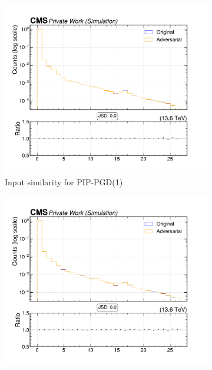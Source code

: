 \begin{figure}[htbp]
  \centering
  \begin{subfigure}[t]{0.32\textwidth}
    \includegraphics[width=\linewidth]{media/output/features/compare/combined_it_1/cmp_vtx_arr_sv_d3d.pdf}
    \caption*{Input similarity for PIP-PGD(1)}
  \end{subfigure}\hfill
  \begin{subfigure}[t]{0.32\textwidth}
    \includegraphics[width=\linewidth]{media/output/features/compare/combined_it_2/cmp_vtx_arr_sv_d3d.pdf}

\end{subfigure}
\end{figure}
